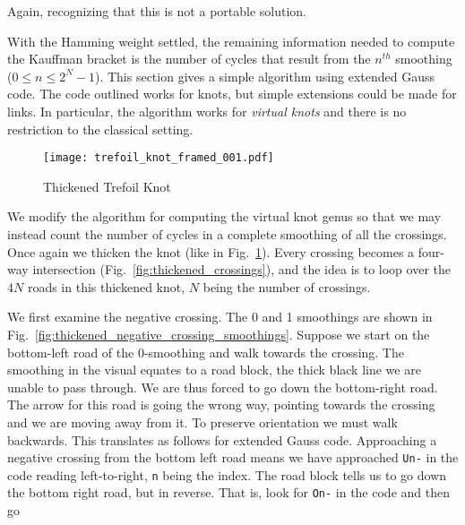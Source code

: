         Again, recognizing that this is not a portable solution.
        \par\hfill\par
        With the Hamming weight settled, the remaining information needed to
        compute the Kauffman bracket is the number of cycles that result from
        the $n^{th}$ smoothing ($0\leq{n}\leq{2}^{N}-1$). This section gives a
        simple algorithm using extended Gauss code. The code outlined works for
        knots, but simple extensions could be made for links. In particular, the
        algorithm works for \textit{virtual knots} and there is no restriction
        to the classical setting.
        \par\hfill\par
        \begin{figure}
            \centering
            \texttt{[image: trefoil\_knot\_framed\_001.pdf]}
            \caption{Thickened Trefoil Knot}
            \label{fig:trefoil_knot_framed_001}
        \end{figure}
        We modify the algorithm for computing the virtual knot genus so that we
        may instead count the number of cycles in a complete smoothing of all
        the crossings. Once again we thicken the knot
        (like in Fig.~\ref{fig:trefoil_knot_framed_001}). Every
        crossing becomes a four-way intersection
        (Fig.~\ref{fig:thickened_crossings}), and the idea is to loop
        over the $4N$ roads in this thickened knot, $N$ being the number of
        crossings.
        \par\hfill\par
        We first examine the negative crossing. The 0 and 1
        smoothings are shown in
        Fig.~\ref{fig:thickened_negative_crossing_smoothings}. Suppose we start
        on the bottom-left road of the 0-smoothing and walk towards the
        crossing. The smoothing in the visual equates to a road block, the thick
        black line we are unable to pass through. We are thus forced to go down
        the bottom-right road. The arrow for this road is going the wrong way,
        pointing towards the crossing and we are moving away from it.
        To preserve orientation we must walk backwards. This translates as
        follows for extended Gauss code. Approaching a negative crossing from
        the bottom left road means we have approached \texttt{Un-} in
        the code reading left-to-right, \texttt{n} being the index. The
        road block tells us to go down the bottom right road, but in reverse.
        That is, look for \texttt{On-} in the code and then go
